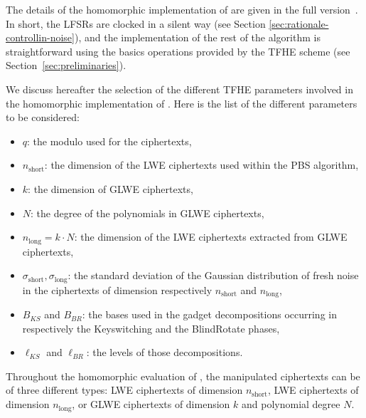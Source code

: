 \ifeprint
\else
	The details of the homomorphic implementation of \coolName{} are given in the full version~\cite{EPRINT:BBBBCL25}. In short, the LFSRs are clocked in a silent way (see Section \ref{sec:rationale-controllin-noise}), and the implementation of the rest of the algorithm is straightforward using the basics operations provided by the TFHE scheme (see Section~\ref{sec:preliminaries}). 
\fi

We discuss hereafter the selection of the different TFHE parameters involved in the homomorphic implementation of \coolName. Here is the list of the different parameters to be considered:
\begin{itemize}
	\item $q$: the modulo used for the ciphertexts,
	\item $n_{\text{short}}$: the dimension of the LWE ciphertexts used within the PBS algorithm,
	\item $k$: the dimension of GLWE ciphertexts,
	\item $N$: the degree of the polynomials in GLWE ciphertexts,
	\item $n_{\text{long}} = k \cdot N$: the dimension of the LWE ciphertexts extracted from GLWE ciphertexts,
	\item $\sigma_{\text{short}}, \sigma_{\text{long}}$: the standard deviation of the Gaussian distribution of fresh noise in the ciphertexts of dimension respectively $n_{\text{short}}$ and  $n_{\text{long}}$,
	\item $B_{KS}$ and $B_{BR}$: the bases used in the gadget decompositions occurring in respectively the \textsf{Keyswitching} and the \textsf{BlindRotate} phases,
	\item $\ell_{KS}$ and $\ell_{BR}$: the levels of those decompositions.
\end{itemize}

Throughout the homomorphic evaluation of \coolName, the manipulated ciphertexts can be of three different types: LWE ciphertexts of dimension $n_{\text{short}}$, LWE ciphertexts of dimension $n_{\text{long}}$, or GLWE ciphertexts of dimension $k$ and polynomial degree $N$. 
\else %

\fi

